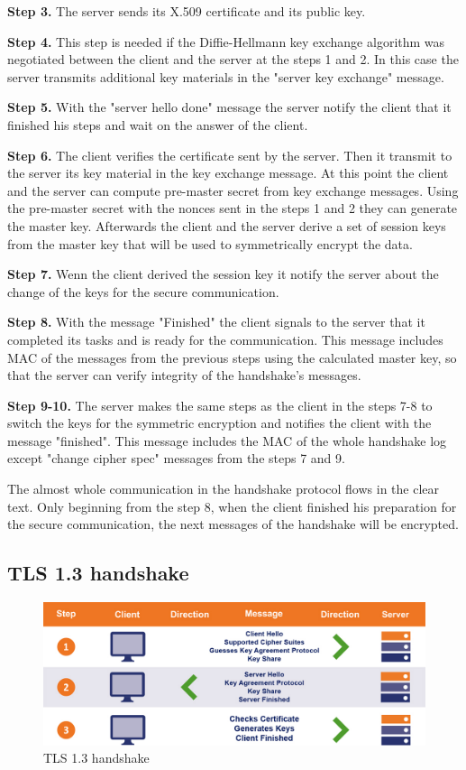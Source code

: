 \textbf{Step 3.} The server sends its X.509 certificate and its public key.

\textbf{Step 4.} This step is needed if the Diffie-Hellmann key exchange algorithm was negotiated between the client and the server at the steps 1 and 2. In this case the server transmits additional key materials in the "server key exchange" message.

\textbf{Step 5.} With the "server hello done" message the server notify the client that it finished his steps and wait on the answer of the client.

\textbf{Step 6.} The client verifies the certificate sent by the server. Then it transmit to the server its key material in the key exchange message. 
At this point the client and the server can compute pre-master secret from key exchange messages. Using the pre-master secret with the nonces sent in the steps 1 and 2 they can generate the master key. Afterwards the client and the server derive a set of session keys from the master key that will be used to symmetrically encrypt the data.

\textbf{Step 7.} Wenn the client derived the session key it notify the server about the change of the keys for the secure communication.

\textbf{Step 8.} With the message "Finished" the client signals to the server that it completed its tasks and is ready for the communication. This message includes MAC of the messages from the previous steps using the calculated master key, so that the server can verify integrity of the handshake's messages.

\textbf{Step 9-10.} The server makes the same steps as the client in the steps 7-8 to switch the keys for the symmetric encryption and notifies the client with the message "finished". This message includes the MAC of the whole handshake log except "change cipher spec" messages from the steps 7 and 9. \cite{sslstore:handshake}\cite{Hassenstein}

The almost whole communication in the handshake protocol flows in the clear text. Only beginning from the step 8, when the client finished his preparation for the secure communication, the next messages of the handshake will be encrypted.

\subsection{TLS 1.3 handshake}
\label{subsec:handshake1_3}

\begin{figure}[H]
	\centering
		\includegraphics[scale=0.35]{images/handshake1_3.jpg}
	\caption{TLS 1.3 handshake \cite{sslstore:handshake}}
	\label{fig:handshake1_3}
\end{figure}


